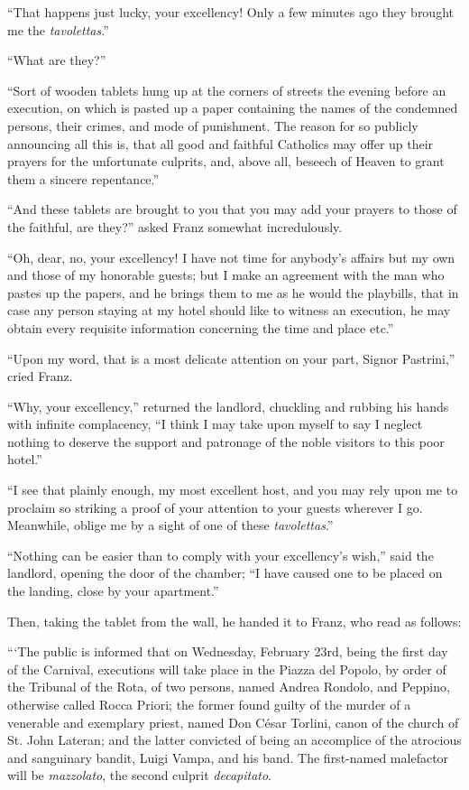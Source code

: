 “That happens just lucky, your excellency! Only a few minutes ago they
brought me the \textit{tavolettas}.”

“What are they?”

“Sort of wooden tablets hung up at the corners of streets the evening
before an execution, on which is pasted up a paper containing the names
of the condemned persons, their crimes, and mode of punishment. The
reason for so publicly announcing all this is, that all good and
faithful Catholics may offer up their prayers for the unfortunate
culprits, and, above all, beseech of Heaven to grant them a sincere
repentance.”

“And these tablets are brought to you that you may add your prayers to
those of the faithful, are they?” asked Franz somewhat incredulously.

“Oh, dear, no, your excellency! I have not time for anybody’s affairs
but my own and those of my honorable guests; but I make an agreement
with the man who pastes up the papers, and he brings them to me as he
would the playbills, that in case any person staying at my hotel should
like to witness an execution, he may obtain every requisite information
concerning the time and place etc.”

“Upon my word, that is a most delicate attention on your part, Signor
Pastrini,” cried Franz.

“Why, your excellency,” returned the landlord, chuckling and rubbing
his hands with infinite complacency, “I think I may take upon myself to
say I neglect nothing to deserve the support and patronage of the noble
visitors to this poor hotel.”

“I see that plainly enough, my most excellent host, and you may rely
upon me to proclaim so striking a proof of your attention to your
guests wherever I go. Meanwhile, oblige me by a sight of one of these
\textit{tavolettas}.”

“Nothing can be easier than to comply with your excellency’s wish,”
said the landlord, opening the door of the chamber; “I have caused one
to be placed on the landing, close by your apartment.”

Then, taking the tablet from the wall, he handed it to Franz, who read
as follows:

“‘The public is informed that on Wednesday, February 23rd, being the
first day of the Carnival, executions will take place in the Piazza del
Popolo, by order of the Tribunal of the Rota, of two persons, named
Andrea Rondolo, and Peppino, otherwise called Rocca Priori; the former
found guilty of the murder of a venerable and exemplary priest, named
Don César Torlini, canon of the church of St. John Lateran; and the
latter convicted of being an accomplice of the atrocious and sanguinary
bandit, Luigi Vampa, and his band. The first-named malefactor will be
\textit{mazzolato}, the second culprit \textit{decapitato}.

